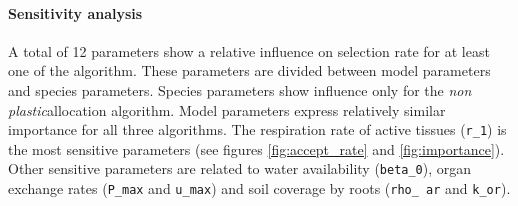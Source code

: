 
\paragraph{Sensitivity analysis}


A total of 12 parameters show a relative influence on selection rate for at least one of the algorithm. These parameters are divided between model parameters and species parameters. Species parameters show influence only for the \textit{non plastic}allocation algorithm. Model parameters express relatively similar importance for all three algorithms. The respiration rate of active tissues (\texttt{r\_1}) is the most sensitive parameters (see figures \ref{fig:accept_rate} and \ref{fig:importance}). Other sensitive parameters are related to water availability (\texttt{beta\_0}), organ exchange rates (\texttt{P\_max} and \texttt{u\_max}) and soil coverage by roots (\texttt{rho\_ ar} and \texttt{k\_or}).

